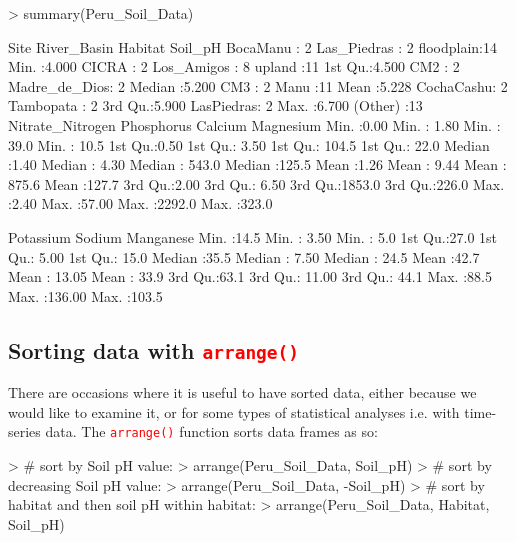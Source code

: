 \documentclass[a4paper,12pt]{article}
\newcommand\code[1]{\textcolor{red}{\texttt{#1}}}
\begin{document}
\begin{shaded}
\begin{Schunk}
\begin{Sinput}
> summary(Peru_Soil_Data)
\end{Sinput}
\begin{Soutput}
         Site           River_Basin       Habitat      Soil_pH     
 BocaManu  : 2   Las_Piedras  : 2   floodplain:14   Min.   :4.000  
 CICRA     : 2   Los_Amigos   : 8   upland    :11   1st Qu.:4.500  
 CM2       : 2   Madre_de_Dios: 2                   Median :5.200  
 CM3       : 2   Manu         :11                   Mean   :5.228  
 CochaCashu: 2   Tambopata    : 2                   3rd Qu.:5.900  
 LasPiedras: 2                                      Max.   :6.700  
 (Other)   :13                                                     
 Nitrate_Nitrogen   Phosphorus       Calcium         Magnesium    
 Min.   :0.00     Min.   : 1.80   Min.   :  39.0   Min.   : 10.5  
 1st Qu.:0.50     1st Qu.: 3.50   1st Qu.: 104.5   1st Qu.: 22.0  
 Median :1.40     Median : 4.30   Median : 543.0   Median :125.5  
 Mean   :1.26     Mean   : 9.44   Mean   : 875.6   Mean   :127.7  
 3rd Qu.:2.00     3rd Qu.: 6.50   3rd Qu.:1853.0   3rd Qu.:226.0  
 Max.   :2.40     Max.   :57.00   Max.   :2292.0   Max.   :323.0  
                                                                  
   Potassium        Sodium         Manganese    
 Min.   :14.5   Min.   :  3.50   Min.   :  5.0  
 1st Qu.:27.0   1st Qu.:  5.00   1st Qu.: 15.0  
 Median :35.5   Median :  7.50   Median : 24.5  
 Mean   :42.7   Mean   : 13.05   Mean   : 33.9  
 3rd Qu.:63.1   3rd Qu.: 11.00   3rd Qu.: 44.1  
 Max.   :88.5   Max.   :136.00   Max.   :103.5  
\end{Soutput}
\end{Schunk}
\end{shaded}

\subsection{Sorting data with \code{arrange()}}

There are occasions where it is useful to have sorted data, either because we would like to examine it, or for some types of statistical analyses i.e. with time-series data. The \code{arrange()} function sorts data frames as so:

\begin{shaded}
\begin{Schunk}
\begin{Sinput}
> # sort by Soil pH value:
> arrange(Peru_Soil_Data, Soil_pH) 
> # sort by decreasing Soil pH value:
> arrange(Peru_Soil_Data, -Soil_pH) 
> # sort by habitat and then soil pH within habitat:
> arrange(Peru_Soil_Data, Habitat, Soil_pH) 
\end{Sinput}
\end{Schunk}
\end{shaded}
\end{document}
